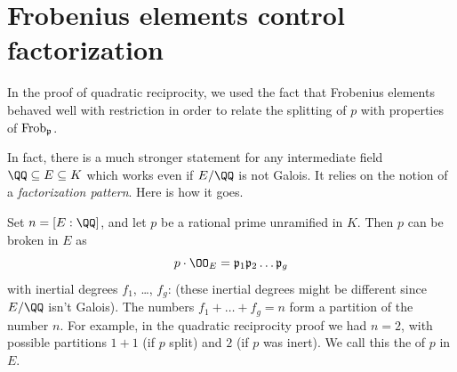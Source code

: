 \section{Frobenius elements control factorization}
In the proof of quadratic reciprocity, we used the fact that Frobenius elements behaved
well with restriction in order to relate the splitting of $p$ with properties of $\mathrm{Frob}_\mathfrak p$.

In fact, there is a much stronger statement for
any intermediate field $\QQ \subseteq E \subseteq K$
which works even if $E/\QQ$ is not Galois.
It relies on the notion of a \emph{factorization pattern}.
Here is how it goes.

Set $n = [E:\QQ]$, and let $p$ be a rational prime unramified in $K$.
Then $p$ can be broken in $E$ as
\[ p \cdot \OO_E = \pp_1 \pp_2 \dots \pp_g \]
with inertial degrees $f_1$, \dots, $f_g$:
(these inertial degrees might be different since $E/\QQ$ isn't Galois).
The numbers $f_1 + \dots + f_g = n$ form a partition of the number $n$.
For example, in the quadratic reciprocity proof we had $n = 2$,
with possible partitions $1 + 1$ (if $p$ split) and $2$ (if $p$ was inert).
We call this the  of $p$ in $E$.

